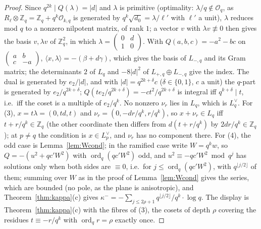 \documentclass[11pt,reqno]{amsart}
\theoremstyle{plain}
\theoremstyle{definition}
\DeclareMathOperator{\ord}{ord}
\newcommand{\Z}{\mathbb{Z}}
\begin{document}
\begin{proof}
Since $q^{2k}\mid Q(\lambda)=\lvert d\rvert$ and $\lambda$ is primitive (optimality: $\lambda/q\notin
\mathcal O_q$, as $R_\ell\otimes\Z_q=\Z_q+q^k\mathcal O_{k,q}$ is generated by $q^k\sqrt{d_0}=
\lambda/\ell'$ with $\ell'$ a unit), $\lambda$ reduces mod $q$ to a nonzero nilpotent matrix, of rank
$1$; a vector $v$ with $\lambda v\not\equiv0$ then gives the basis $v,\lambda v$ of $\Z_q^2$, in
which $\lambda=\begin{pmatrix}0&d\\1&0\end{pmatrix}$. With $Q(a,b,c)=-a^2-bc$ on $\begin{pmatrix}
a&b\\c&-a\end{pmatrix}$, $\langle x,\lambda\rangle=-(\beta+d\gamma)$, which gives the basis of
$L_{-,q}$ and its Gram matrix; the determinants $2$ of $L_q$ and $-8\lvert d\rvert^2$ of $L_{+,q}
\oplus L_{-,q}$ give the index. The dual is generated by $e_2/\lvert d\rvert$, and with $\lvert d\rvert=q^{2k+\delta}c$
($\delta\in\{0,1\}$, $c$ a unit) the $q$-part is generated by $e_2/q^{2k+\delta}$; $Q(te_2/q^{2k+\delta})
=-ct^2/q^{2k+\delta}$ is integral iff $q^{k+\delta}\mid t$, i.e.\ iff the coset is a multiple of
$e_2/q^k$. No nonzero $\nu_r$ lies in $L_q$, which is $L_q^\vee$.
For (3), $x=t\lambda=(0,td,t)$ and $\nu_r=(0,-dr/q^k,r/q^k)$, so $x+\nu_r\in L_q$ iff $t+r/q^k
\in\Z_q$ (the other coordinate then differs from $d(t+r/q^k)$ by $2dr/q^k\in\Z_q$); at $p\neq q$
the condition is $x\in L_p^\vee$, and $\nu_r$ has no component there. For (4), the odd case is
Lemma~\ref{lem:Wcond}; in the ramified case write $W=q^kw$, so $Q=-(u^2+qc'W^2)$ with $\ord_q(qc'W^2)$
odd, and $u^2\equiv-qc'W^2\bmod q^j$ has solutions only when both sides are $\equiv0$, i.e.\ for
$j\le\ord_q(qc'W^2)$, with $q^{\lfloor j/2\rfloor}$ of them; summing over $W$ as in the proof of
Lemma~\ref{lem:Wcond} gives the series, which are bounded (no pole, as the plane is anisotropic), and
Theorem~\ref{thm:kappa}(c) gives $\kappa^-=-\sum_{j\le2\rho+1}q^{\lfloor j/2\rfloor}/q^k\cdot\log q$.
The display is Theorem~\ref{thm:kappa}(c) with the fibres of (3), the cosets of depth $\rho$
covering the residues $t\equiv-r/q^k$ with $\ord_qr=\rho$ exactly once.
\end{proof}
\end{document}
